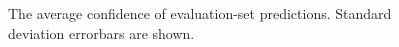 \documentclass[bsc,frontabs,singlespacing,parskip,deptreport]{infthesis}
\begin{document}
{{    \begin{figure}[h!tb]
      \centering
      \caption{The average confidence of evaluation-set predictions. Standard deviation errorbars are shown.}
      \label{fig:prediction-analysis-avg-confidence}
    \end{figure}

}}
\end{document}
